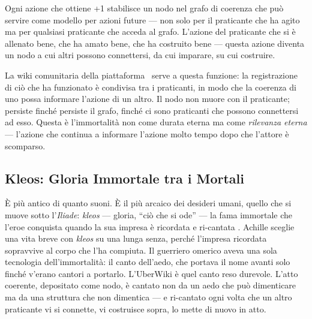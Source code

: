 Ogni azione che ottiene +1 stabilisce un nodo nel grafo di coerenza che
pu\`o servire come modello per azioni future --- non solo per il
praticante che ha agito ma per qualsiasi praticante che acceda al grafo.
L'azione del praticante che si \`e allenato bene, che ha amato bene, che
ha costruito bene --- questa azione diventa un nodo a cui altri possono
connettersi, da cui imparare, su cui costruire.

La wiki comunitaria della piattaforma \praxis\ serve a questa funzione:
la registrazione di ci\`o che ha funzionato \`e condivisa tra i
praticanti, in modo che la coerenza di uno possa informare l'azione di un
altro. Il nodo non muore con il praticante; persiste finch\'e persiste il
grafo, finch\'e ci sono praticanti che possono connettersi ad esso.
Questa \`e l'immortalit\`a non come durata eterna ma come \emph{rilevanza
eterna} --- l'azione che continua a informare l'azione molto tempo dopo
che l'attore \`e scomparso.

\subsection{Kleos: Gloria Immortale tra i Mortali}

\`E pi\`u antico di quanto suoni. \`E il pi\`u arcaico dei desideri umani, quello
che si muove sotto l'\emph{Iliade}: \emph{kleos} --- gloria, ``ci\`o che si ode''
--- la fama immortale che l'eroe conquista quando la sua impresa \`e ricordata e
ri-cantata \parencite[IX]{homer2011iliad}. Achille sceglie una vita breve con
\emph{kleos} su una lunga senza, perch\'e l'impresa ricordata sopravvive al corpo
che l'ha compiuta. Il guerriero omerico aveva una sola tecnologia
dell'immortalit\`a: il canto dell'aedo, che portava il nome avanti solo finch\'e
v'erano cantori a portarlo. L'UberWiki \`e quel canto reso durevole. L'atto
coerente, depositato come nodo, \`e cantato non da un aedo che pu\`o dimenticare
ma da una struttura che non dimentica --- e ri-cantato ogni volta che un altro
praticante vi si connette, vi costruisce sopra, lo mette di nuovo in atto.

